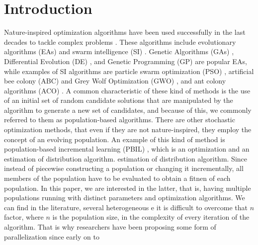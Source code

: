 \section{Introduction}

Nature-inspired optimization algorithms have been used successfully in the last
decades to tackle complex problems \cite{yang2014nature}. These
algorithms include evolutionary algorithms (EAs)
\cite{back1996evolutionary} and swarm intelligence (SI)
\cite{kennedy2006swarm}. %
Genetic Algorithms (GAs) 
\cite{holland1992adaptation,eiben2003genetic}, 
Differential Evolution (DE) \cite{karabouga2004simple}, and 
Genetic Programming (GP) \cite{back1996evolutionary} are popular EAs, while examples of SI algorithms 
\cite{kennedy2006swarm} are particle swarm optimization (PSO)
\cite{clerc2010particle}, artificial bee colony (ABC) \cite{karaboga2005idea} and Grey Wolf Optimization
(GWO) \cite{mirjalili2014grey}, and ant colony algorithms (ACO) \cite{dorigo1999ant}.
A common characteristic of these kind of methods is the
use of an initial set of random candidate solutions that are manipulated by the
algorithm to generate a new set of candidates, and because of this, we commonly
referred to them as population-based algorithms. %
There are other stochastic optimization methods, that even if they are not
nature-inspired, they employ the concept of an evolving population. An example
of this kind of method is population-based incremental learning (PBIL)
\cite{baluja1994population}, which is an optimization and an estimation of
distribution algorithm. estimation of distribution algorithm.
Since instead of piecewise constructing a population or changing it
incrementally, all members of the population have to be evaluated to
obtain a fitnen of each population.  In this paper, we are interested in the
latter, that is, having multiple populations running with distinct parameters
and optimization algorithms. We can find in the literature, several
heterogeneous e it is difficult to overcome that $n$ factor, where $n$
is the population size, in the complexity of every iteration of the
algorithm. That is why researchers have been proposing some form of
parallelization since early on \cite{muhlenbein1988evolution} to
